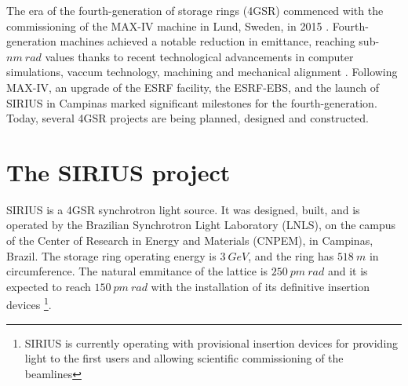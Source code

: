 The era of the fourth-generation of storage rings (4GSR) commenced with the commissioning of the MAX-IV machine in Lund, Sweden, in 2015 \cite{liu_towards_2017,hettel_challenges_2014}. Fourth-generation machines achieved a notable reduction in emittance, reaching sub-$\unit{nm}~\unit{rad}$ values thanks to recent technological advancements in computer simulations, vaccum technology, machining and mechanical alignment \cite{hettel_challenges_2014,liu_towards_2017}. Following MAX-IV, an upgrade of the ESRF facility, the ESRF-EBS, and the launch of SIRIUS in Campinas marked significant milestones for the fourth-generation. Today, several 4GSR projects are being planned, designed and constructed.

\section{The SIRIUS project}
SIRIUS is a 4GSR synchrotron light source. It was designed, built, and is operated by the Brazilian Synchrotron Light Laboratory (LNLS), on the campus of the Center of Research in Energy and Materials (CNPEM), in Campinas, Brazil. The storage ring operating energy is $3~\unit{GeV}$, and the ring has $518~\unit{m}$ in circumference. The natural emmitance of the lattice is $250~\unit{pm}~\unit{rad}$ and it is expected to reach $150~\unit{pm}~\unit{rad}$ with the installation of its definitive insertion devices \cite{liu_synchrotron_2019}\footnote{SIRIUS is currently operating with provisional insertion devices for providing light to the first users and allowing scientific commissioning of the beamlines}.

